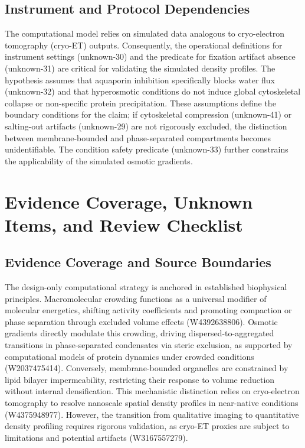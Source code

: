 \documentclass[conference]{IEEEtran}
\begin{document}
\subsection{Instrument and Protocol Dependencies}
The computational model relies on simulated data analogous to cryo-electron tomography (cryo-ET) outputs. Consequently, the operational definitions for instrument settings (unknown-30) and the predicate for fixation artifact absence (unknown-31) are critical for validating the simulated density profiles. The hypothesis assumes that aquaporin inhibition specifically blocks water flux (unknown-32) and that hyperosmotic conditions do not induce global cytoskeletal collapse or non-specific protein precipitation. These assumptions define the boundary conditions for the claim; if cytoskeletal compression (unknown-41) or salting-out artifacts (unknown-29) are not rigorously excluded, the distinction between membrane-bounded and phase-separated compartments becomes unidentifiable. The condition safety predicate (unknown-33) further constrains the applicability of the simulated osmotic gradients.

\section{Evidence Coverage, Unknown Items, and Review Checklist}
\subsection{Evidence Coverage and Source Boundaries}
The design-only computational strategy is anchored in established biophysical principles. Macromolecular crowding functions as a universal modifier of molecular energetics, shifting activity coefficients and promoting compaction or phase separation through excluded volume effects (W4392638806). Osmotic gradients directly modulate this crowding, driving dispersed-to-aggregated transitions in phase-separated condensates via steric exclusion, as supported by computational models of protein dynamics under crowded conditions (W2037475414). Conversely, membrane-bounded organelles are constrained by lipid bilayer impermeability, restricting their response to volume reduction without internal densification. This mechanistic distinction relies on cryo-electron tomography to resolve nanoscale spatial density profiles in near-native conditions (W4375948977). However, the transition from qualitative imaging to quantitative density profiling requires rigorous validation, as cryo-ET proxies are subject to limitations and potential artifacts (W3167557279).~\cite{cite_42ed299a53990c06,cite_8d46403814b99258,cite_9ae4c49700eea560,cite_c2d09a021a2238e3}
\end{document}
